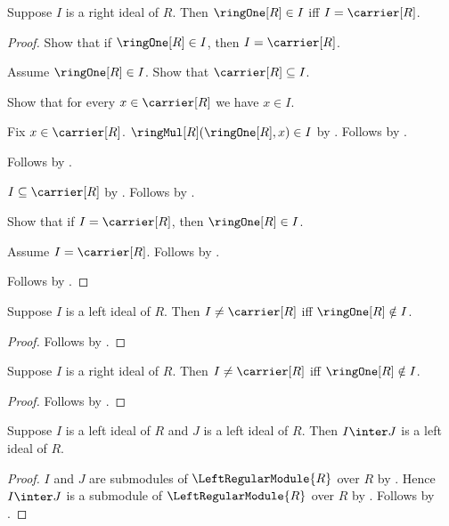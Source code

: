 \begin{theorem}\label{right_ideal_contains_one_iff_full}
    Suppose $I$ is a right ideal of $R$.
    Then $\ringOne[R]\in I$ iff $I=\carrier[R]$.
\end{theorem}
\begin{proof}
    Show that if $\ringOne[R]\in I$, then $I=\carrier[R]$.
    \begin{subproof}
        Assume $\ringOne[R]\in I$.
        Show that $\carrier[R]\subseteq I$.
        \begin{subproof}
            Show that for every $x\in\carrier[R]$ we have $x\in I$.
            \begin{subproof}
                Fix $x\in\carrier[R]$.
                $\ringMul[R](\ringOne[R],x)\in I$ by
                    .
                Follows by .
            \end{subproof}
            Follows by .
        \end{subproof}
        $I\subseteq\carrier[R]$ by
            .
        Follows by .
    \end{subproof}
    Show that if $I=\carrier[R]$, then $\ringOne[R]\in I$.
    \begin{subproof}
        Assume $I=\carrier[R]$.
        Follows by .
    \end{subproof}
    Follows by \auto.
\end{proof}

\begin{corollary}\label{left_ideal_proper_iff}
    Suppose $I$ is a left ideal of $R$.
    Then $I\neq\carrier[R]$ iff $\ringOne[R]\notin I$.
\end{corollary}
\begin{proof}
    Follows by .
\end{proof}

\begin{corollary}\label{right_ideal_proper_iff}
    Suppose $I$ is a right ideal of $R$.
    Then $I\neq\carrier[R]$ iff $\ringOne[R]\notin I$.
\end{corollary}
\begin{proof}
    Follows by .
\end{proof}

\begin{theorem}\label{left_ideal_intersection}
    Suppose $I$ is a left ideal of $R$ and $J$ is a left ideal of $R$.
    Then $I\inter J$ is a left ideal of $R$.
\end{theorem}
\begin{proof}
    $I$ and $J$ are submodules of $\LeftRegularModule{R}$ over $R$ by
        .
    Hence $I\inter J$ is a submodule of $\LeftRegularModule{R}$ over $R$
        by .
    Follows by .
\end{proof}

